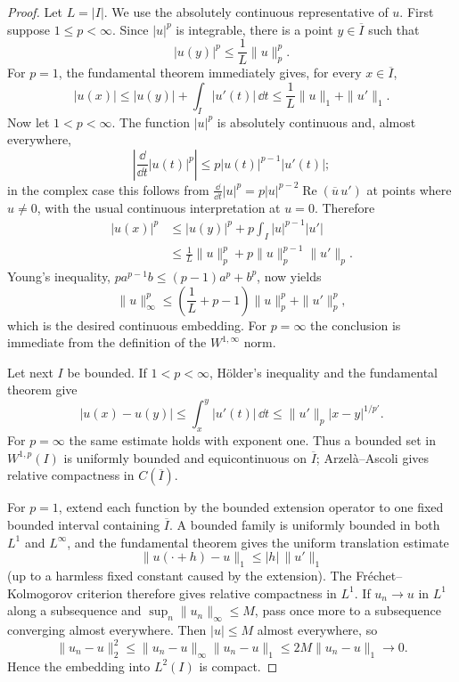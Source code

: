 \begin{proof}
Let $L=|I|$.  We use the absolutely continuous representative of $u$.
First suppose $1\le p<\infty$.  Since $|u|^p$ is integrable, there is a point
$y\in\overline I$ such that
\[
  |u(y)|^p\le \frac1L\|u\|_p^p.
\]
For $p=1$, the fundamental theorem immediately gives, for every
$x\in\overline I$,
\[
  |u(x)|
  \le |u(y)|+\int_I|u'(t)|\,\dd t
  \le \frac1L\|u\|_1+\|u'\|_1.
\]
Now let $1<p<\infty$.  The function $|u|^p$ is absolutely continuous and,
almost everywhere,
\[
  \left|\frac{\dd}{\dd t}|u(t)|^p\right|
  \le p|u(t)|^{p-1}|u'(t)|;
\]
in the complex case this follows from
$\frac{\dd}{\dd t}|u|^p
 =p|u|^{p-2}\operatorname{Re}(\overline u\,u')$ at points where $u\ne0$,
with the usual continuous interpretation at $u=0$.  Therefore
\[
\begin{aligned}
  |u(x)|^p
  &\le |u(y)|^p
       +p\int_I|u|^{p-1}|u'| \\
  &\le \frac1L\|u\|_p^p
       +p\|u\|_p^{p-1}\|u'\|_p.
\end{aligned}
\]
Young's inequality,
$p a^{p-1}b\le(p-1)a^p+b^p$, now yields
\[
  \|u\|_\infty^p
  \le \left(\frac1L+p-1\right)\|u\|_p^p+\|u'\|_p^p,
\]
which is the desired continuous embedding.  For $p=\infty$ the conclusion is
immediate from the definition of the $W^{1,\infty}$ norm.

Let next $I$ be bounded.  If $1<p<\infty$, Hölder's inequality and the
fundamental theorem give
\[
  |u(x)-u(y)|
  \le \int_x^y|u'(t)|\,\dd t
  \le \|u'\|_p|x-y|^{1/p'}.
\]
For $p=\infty$ the same estimate holds with exponent one.  Thus a bounded set
in $W^{1,p}(I)$ is uniformly bounded and equicontinuous on $\overline I$;
Arzelà--Ascoli gives relative compactness in $C(\overline I)$.

For $p=1$, extend each function by the bounded extension operator to one fixed
bounded interval containing $\overline I$.  A bounded family is uniformly
bounded in both $L^1$ and $L^\infty$, and the fundamental theorem gives the
uniform translation estimate
\[
  \|u(\cdot+h)-u\|_1\le |h|\,\|u'\|_1
\]
(up to a harmless fixed constant caused by the extension).  The
Fréchet--Kolmogorov criterion therefore gives relative compactness in $L^1$.
If $u_n\to u$ in $L^1$ along a subsequence and
$\sup_n\|u_n\|_\infty\le M$, pass once more to a subsequence converging
almost everywhere.  Then $|u|\le M$ almost everywhere, so
\[
  \|u_n-u\|_2^2
  \le \|u_n-u\|_\infty\|u_n-u\|_1
  \le 2M\|u_n-u\|_1\longrightarrow0.
\]
Hence the embedding into $L^2(I)$ is compact.
\end{proof}


